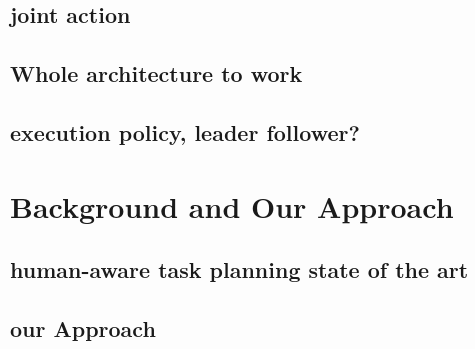 \subsection{joint action}
\subsection{Whole architecture to work}
\subsection{execution policy, leader follower?}

\section{Background and Our Approach}
\subsection{human-aware task planning state of the art}
\subsection{our Approach}


